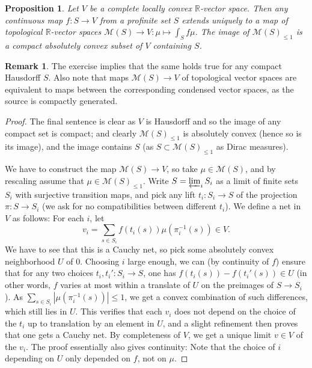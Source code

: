 \documentclass[11pt]{amsbook}
\numberwithin{equation}{section}
\numberwithin{theorem}{section}
\newtheorem{proposition}[theorem]{Proposition}
\theoremstyle{definition}
\newtheorem{remark}[theorem]{Remark}
\begin{document}
\begin{proposition}\label{prop:completelocallyconvex} Let $V$ be a complete locally convex $\mathbb R$-vector space. Then any continuous map $f: S\to V$ from a profinite set $S$ extends uniquely to a map of topological $\mathbb R$-vector spaces $\mathcal M(S)\to V: \mu\mapsto \int_S f\mu$. The image of $\mathcal M(S)_{\leq 1}$ is a compact absolutely convex subset of $V$ containing $S$.
\end{proposition}

\begin{remark} The exercise implies that the same holds true for any compact Hausdorff $S$. Also note that maps $\mathcal M(S)\to V$ of topological vector spaces are equivalent to maps between the corresponding condensed vector spaces, as the source is compactly generated.
\end{remark}

\begin{proof} The final sentence is clear as $V$ is Hausdorff and so the image of any compact set is compact; and clearly $\mathcal M(S)_{\leq 1}$ is absolutely convex (hence so is its image), and the image contains $S$ (as $S\subset \mathcal M(S)_{\leq 1}$ as Dirac measures).

We have to construct the map $\mathcal M(S)\to V$, so take $\mu\in \mathcal M(S)$, and by rescaling assume that $\mu\in \mathcal M(S)_{\leq 1}$. Write $S=\varprojlim_i S_i$ as a limit of finite sets $S_i$ with surjective transition maps, and pick any lift $t_i: S_i\to S$ of the projection $\pi: S\to S_i$ (we ask for no compatibilities between different $t_i$). We define a net in $V$ as follows: For each $i$, let
\[
v_i = \sum_{s\in S_i} f(t_i(s)) \mu(\pi_i^{-1}(s)) \in V.
\]
We have to see that this is a Cauchy net, so pick some absolutely convex neighborhood $U$ of $0$. Choosing $i$ large enough, we can (by continuity of $f$) ensure that for any two choices $t_i,t_i': S_i\to S$, one has $f(t_i(s))-f(t_i'(s))\in U$ (in other words, $f$ varies at most within a translate of $U$ on the preimages of $S\to S_i$). As $\sum_{s\in S_i} |\mu(\pi_i^{-1}(s))|\leq 1$, we get a convex combination of such differences, which still lies in $U$. This verifies that each $v_i$ does not depend on the choice of the $t_i$ up to translation by an element in $U$, and a slight refinement then proves that one gets a Cauchy net. By completeness of $V$, we get a unique limit $v\in V$ of the $v_i$. The proof essentially also gives continuity: Note that the choice of $i$ depending on $U$ only depended on $f$, not on $\mu$.
\end{proof}
\end{document}
